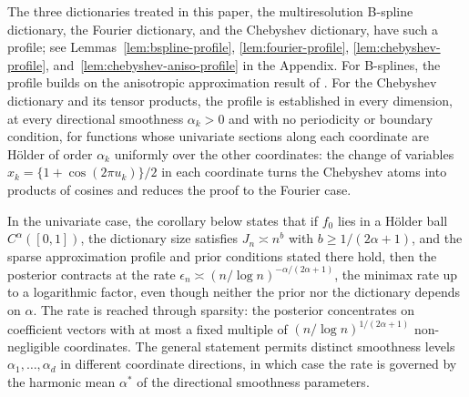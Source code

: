The three dictionaries treated in this paper, the multiresolution B-spline dictionary, the Fourier dictionary, and the Chebyshev dictionary, have such a profile; see Lemmas~\ref{lem:bspline-profile}, \ref{lem:fourier-profile}, \ref{lem:chebyshev-profile}, and~\ref{lem:chebyshev-aniso-profile} in the Appendix. For B-splines, the profile builds on the anisotropic approximation result of \citet[Lemma~2]{ShenGhosal2015}. For the Chebyshev dictionary and its tensor products, the profile is established in every dimension, at every directional smoothness $\alpha_k>0$ and with no periodicity or boundary condition, for functions whose univariate sections along each coordinate are H\"older of order $\alpha_k$ uniformly over the other coordinates: the change of variables $x_k=\{1+\cos(2\pi u_k)\}/2$ in each coordinate turns the Chebyshev atoms into products of cosines and reduces the proof to the Fourier case.

In the univariate case, the corollary below states that if $f_0$ lies in a H\"older ball $C^\alpha([0,1])$, the dictionary size satisfies $J_n\asymp n^b$ with $b\geq1/(2\alpha+1)$, and the sparse approximation profile and prior conditions stated there hold, then the posterior contracts at the rate $\epsilon_n\asymp(n/\log n)^{-\alpha/(2\alpha+1)}$, the minimax rate up to a logarithmic factor, even though neither the prior nor the dictionary depends on $\alpha$. The rate is reached through sparsity: the posterior concentrates on coefficient vectors with at most a fixed multiple of $(n/\log n)^{1/(2\alpha+1)}$ non-negligible coordinates. The general statement permits distinct smoothness levels $\alpha_1,\ldots,\alpha_d$ in different coordinate directions, in which case the rate is governed by the harmonic mean $\alpha^*$ of the directional smoothness parameters.

